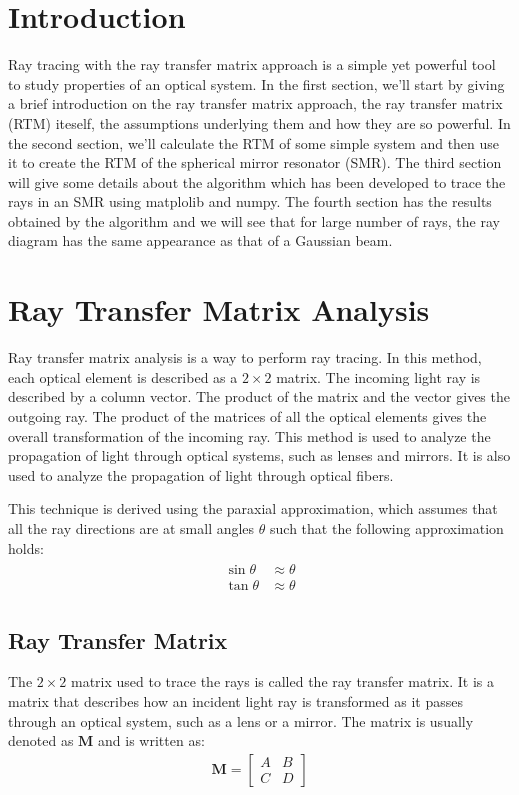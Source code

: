 \documentclass[12pt]{article}
\begin{document}
\section*{Introduction}
Ray tracing with the ray transfer matrix approach is a simple yet powerful tool to study properties of an optical system. In the first section, we'll start by giving a brief introduction on the ray transfer matrix approach, the ray transfer matrix (RTM) iteself, the assumptions underlying them and how they are so powerful. In the second section, we'll calculate the RTM of some simple system and then use it to create the RTM of the spherical mirror resonator (SMR). The third section will give some details about the algorithm which has been developed to trace the rays in an SMR using {\color{cyan} matplolib} and {\color{cyan} numpy}. The fourth section has the results obtained by the algorithm and we will see that for large number of rays, the ray diagram has the same appearance as that of a Gaussian beam.

\section{Ray Transfer Matrix Analysis}
Ray transfer matrix analysis is a way to perform ray tracing. In this method, each optical element is described as a \(2\times 2\) matrix. The incoming light ray is described by a column vector. The product of the matrix and the vector gives the outgoing ray. The product of the matrices of all the optical elements gives the overall transformation of the incoming ray. This method is used to analyze the propagation of light through optical systems, such as lenses and mirrors. It is also used to analyze the propagation of light through optical fibers.\cite{wikipedia}

This technique is derived using the paraxial approximation, which assumes that all the ray directions are at small angles \(\theta\) such that the following approximation holds:
\begin{align}
    \label{eq:paraxial}
    \begin{split}
        \sin \theta &\approx \theta \\
        \tan \theta &\approx \theta
    \end{split}
\end{align}
\subsection{Ray Transfer Matrix}
The \(2\times 2\) matrix used to trace the rays is called the ray transfer matrix. It is a matrix that describes how an incident light ray is transformed as it passes through an optical system, such as a lens or a mirror. The matrix is usually denoted as \(\mathbf{M}\) and is written as:
\begin{align}
    \label{eq:rtm}
    \mathbf{M} = \begin{bmatrix}
                     A & B \\
                     C & D
                 \end{bmatrix}
\end{align}
\end{document}
